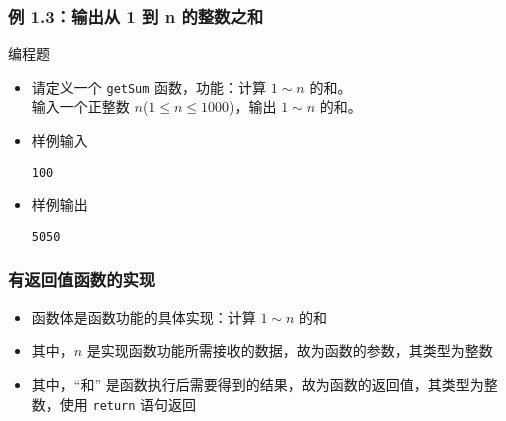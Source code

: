 \begin{frame}[fragile]
    \frametitle{例 1.3：输出从 1 到 n 的整数之和}
        \begin{exampleblock}{编程题}

            \begin{itemize}
                \item 请定义一个 \lstinline|getSum| 函数，功能：计算 $1 \sim n$ 的和。\\
                    输入一个正整数 $n$($1 \le n \le 1000$)，输出 $1 \sim n$ 的和。

                \item 样例输入

                    \lstinline|100|

                \item 样例输出

                    \lstinline|5050|

            \end{itemize}

        \end{exampleblock}
\end{frame}

\begin{frame}[fragile]
    \frametitle{有返回值函数的实现}

    \begin{itemize}[<+->]
        \item 函数体是函数功能的具体实现：计算 $1 \sim n$ 的和
        \item 其中，$n$ 是实现函数功能所需接收的数据，故为函数的参数，其类型为整数
        \item 其中，“和” 是函数执行后需要得到的结果，故为函数的返回值，其类型为整数，使用 \lstinline|return| 语句返回

        
    \end{itemize}
\end{frame}

